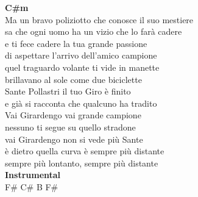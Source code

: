 \documentclass[10pt, twoside, a4paper]{article}
\begin{document}
\begin{multicols}{2}
\textbf{C\#m}\\
Ma un bravo poliziotto che conosce il suo mestiere\\
sa che ogni uomo ha un vizio che lo far\`a cadere\\
e ti fece cadere la tua grande passione\\
di aspettare l’arrivo dell’amico campione\\
quel traguardo volante ti vide in manette\\
brillavano al sole come due biciclette\\
Sante Pollastri il tuo Giro \`e finito\\
e gi\`a si racconta che qualcuno ha tradito\\

Vai Girardengo vai grande campione\\
nessuno ti segue su quello stradone\\
vai Girardengo non si vede pi\`u Sante\\
\`e dietro quella curva \`e sempre pi\`u distante\\
sempre pi\`u lontanto, sempre pi\`u distante\\

\textbf{Instrumental}\\
F\#  C\#  B  F\#
\end{multicols}
\end{document}
